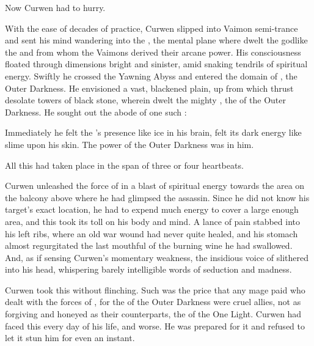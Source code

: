 
Now Curwen had to hurry. 

  
With the ease of decades of practice, Curwen slipped into Vaimon semi-trance and sent his mind wandering into the \empyrean, the mental plane where dwelt the godlike \Archons\dash{}the \sephiroth and \qliphoth\dash from whom the Vaimons derived their arcane power. 
His consciousness floated through dimensions bright and sinister, amid snaking tendrils of spiritual energy. 
Swiftly he crossed the Yawning Abyss and entered the domain of \itzach, the Outer Darkness. 
He envisioned a vast, blackened plain, up from which thrust desolate towers of black stone, wherein dwelt the mighty \qliphoth, the \Archons of the Outer Darkness. 
He sought out the abode of one such \qliphah: 


Immediately he felt the \qliphah's presence like ice in his brain, felt its dark energy like slime upon his skin. 
The power of the Outer Darkness was in him. 

All this had taken place in the span of three or four heartbeats. 

Curwen unleashed the force of \Kithvaz in a blast of spiritual energy towards the area on the balcony above where he had glimpsed the assassin. 
Since he did not know his target's exact location, he had to expend much energy to cover a large enough area, and this took its toll on his body and mind. 
A lance of pain stabbed into his left ribs, where an old war wound had never quite healed, and his stomach almost regurgitated the last mouthful of the burning wine he had swallowed. 
And, as if sensing Curwen's momentary weakness, the insidious voice of \Kithvaz slithered into his head, whispering barely intelligible words of seduction and madness. 

Curwen took this without flinching. 
Such was the price that any mage paid who dealt with the forces of \itzach, for the \qliphoth of the Outer Darkness were cruel allies, not as forgiving and honeyed as their counterparts, the \sephiroth of the One Light. 
Curwen had faced this every day of his life, and worse. 
He was prepared for it and refused to let it stun him for even an instant. 

